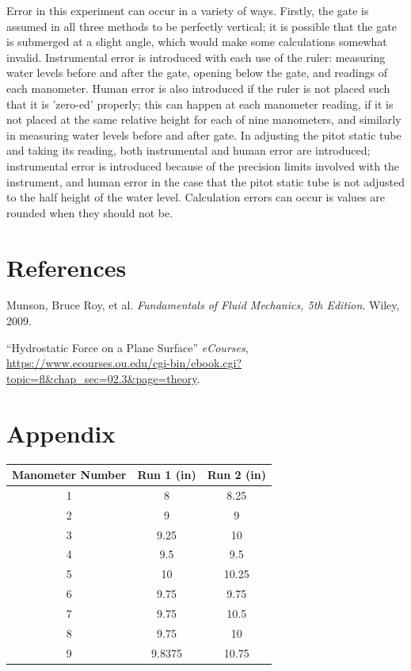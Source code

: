 \documentclass{article}
\begin{document}
\par Error in this experiment can occur in a variety of ways. Firstly, the gate is assumed in all three methods to be perfectly vertical; it is possible that the gate is submerged at a slight angle, which would make some calculations somewhat invalid. Instrumental error is introduced with each use of the ruler: measuring water levels before and after the gate, opening below the gate, and readings of each manometer. Human error is also introduced if the ruler is not placed such that it is 'zero-ed' properly; this can happen at each manometer reading, if it is not placed at the same relative height for each of nine manometers, and similarly in measuring water levels before and after gate. In adjusting the pitot static tube and taking its reading, both instrumental and human error are introduced; instrumental error is introduced because of the precision limits involved with the instrument, and human error in the case that the pitot static tube is not adjusted to the half height of the water level. Calculation errors can occur is values are rounded when they should not be. 



\newpage
\section{References}
\begin{description}
    \item[] Munson, Bruce Roy, et al. \emph{Fundamentals of Fluid Mechanics, 5th Edition}. Wiley, 2009.  
    \item ``Hydrostatic Force on a Plane Surface'' \emph{eCourses}, \url{https://www.ecourses.ou.edu/cgi-bin/ebook.cgi?topic=fl&chap_sec=02.3&page=theory}.
\end{description}
\newpage
\section{Appendix}
\begin{center}
\begin{tabular}{|c|c|c|}
    \hline
    \textbf{Manometer Number} & \textbf{Run 1 (in)} & \textbf{Run 2 (in)}  \\\hline
    1                  & 8          & 8.25        \\\hline
    2                  & 9          & 9           \\\hline
    3                  & 9.25       & 10          \\\hline
    4                  & 9.5        & 9.5         \\\hline
    5                  & 10         & 10.25       \\\hline
    6                  & 9.75       & 9.75        \\\hline
    7                  & 9.75       & 10.5        \\\hline
    8                  & 9.75       & 10          \\\hline
    9                  & 9.8375     & 10.75       \\\hline
\end{tabular}
\end{center}
\end{document}
